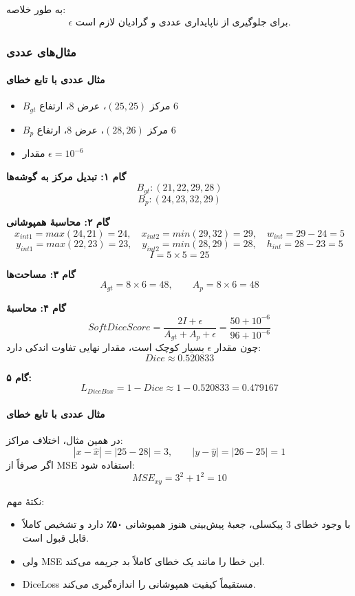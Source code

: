 \documentclass{article}
\begin{document}
به طور خلاصه:
$$ \epsilon \text{ برای جلوگیری از ناپایداری عددی و گرادیان لازم است.} $$

\subsubsection{مثال‌های عددی}

\paragraph{مثال عددی با تابع خطای }
\begin{itemize}
	\item $B_{gt}$ مرکز $(25,25)$، عرض $8$، ارتفاع $6$
	\item $B_p$ مرکز $(28,26)$، عرض $8$، ارتفاع $6$
	\item مقدار $\epsilon = 10^{-6}$
\end{itemize}

\textbf{گام ۱: تبدیل مرکز به گوشه‌ها}
$$ B_{gt}: (21,22,29,28) $$
$$ B_{p}: (24,23,32,29) $$

\textbf{گام ۲: محاسبهٔ همپوشانی}
$$ x_{int1}=max(24,21)=24,\quad x_{int2}=min(29,32)=29,\quad w_{int}=29-24=5 $$
$$ y_{int1}=max(22,23)=23,\quad y_{int2}=min(28,29)=28,\quad h_{int}=28-23=5 $$
$$ I = 5 \times 5 = 25 $$

\textbf{گام ۳: مساحت‌ها}
$$ A_{gt}=8 \times 6 = 48,\qquad A_p =8 \times 6 = 48 $$

\textbf{گام ۴: محاسبۀ }
$$ Soft Dice Score = \frac{2I + \epsilon}{A_{gt} + A_p + \epsilon} = \frac{50 + 10^{-6}}{96 + 10^{-6}} $$
چون مقدار $\epsilon$ بسیار کوچک است، مقدار نهایی تفاوت اندکی دارد:
$$ Dice \approx 0.520833 $$

\textbf{گام ۵: }
$$ L_{DiceBox} = 1 - Dice \approx 1 - 0.520833 = 0.479167 $$

\paragraph{مثال عددی با تابع خطای }
در همین مثال، اختلاف مراکز:
$$ |x-\hat{x}|=|25-28|=3,\qquad |y-\hat{y}|=|26-25|=1 $$
اگر صرفاً از MSE استفاده شود:
$$ MSE_{xy} = 3^2 + 1^2 = 10 $$

نکتهٔ مهم:
\begin{itemize}
	\item با وجود خطای 3 پیکسلی، جعبهٔ پیش‌بینی هنوز همپوشانی \textbf{۵۰٪} دارد و تشخیص کاملاً قابل قبول است.
	\item ولی MSE این خطا را مانند یک خطای کاملاً بد جریمه می‌کند.
	\item DiceLoss مستقیماً کیفیت همپوشانی را اندازه‌گیری می‌کند.
\end{itemize}
\end{document}
